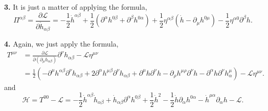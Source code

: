 \textbf{3.} It is just a matter of applying the formula,
\begin{equation}
    \Pi^{\alpha\beta} = \frac{\partial\mathcal{L}}{\partial \dot{h}_{\alpha\beta}} = -\frac{1}{2}\dot{h}^{\alpha\beta} + \frac{1}{2}(\partial^\alpha h^{0\beta} + \partial^\beta h^{0\alpha}) + \frac{1}{2}\eta^{\alpha\beta}(\dot{h} - \partial_\mu h^{0\mu}) - \frac{1}{2}\eta^{\alpha 0}\partial^\beta h.
\end{equation}

\textbf{4.} Again, we just apply the formula,
\begin{equation}
\begin{aligned}
    T^{\mu\nu} &= \frac{\partial\mathcal{L}}{\partial(\partial_\mu h_{\alpha\beta})} \partial^\nu h_{\alpha\beta} - \mathcal{L}\eta^{\mu\nu} \\
    &= \frac{1}{2}(-\partial^\mu h^{\alpha\beta}\partial^\nu h_{\alpha\beta} + 2\partial^\alpha h^{\mu\beta}\partial^\nu h_{\alpha\beta} + \partial^\mu h \partial^\nu h - \partial_\rho h^{\mu\rho}\partial^\nu h - \partial^\alpha h \partial^\nu h^\mu_\alpha) - \mathcal{L}\eta^{\mu\nu}.
\end{aligned}
\end{equation}
and
\begin{equation}
    \mathcal{H} = T^{00} - \mathcal{L} = -\frac{1}{2}\dot{h}^{\alpha\beta}\dot{h}_{\alpha\beta} + \dot{h}_{\alpha\beta}\partial^\alpha h^{0\beta} + \frac{1}{2}\dot{h}^2 - \frac{1}{2}\dot{h}\partial_\alpha h^{0\alpha} - \dot{h}^{\mu\alpha}\partial_\alpha h - \mathcal{L}.
\end{equation}

